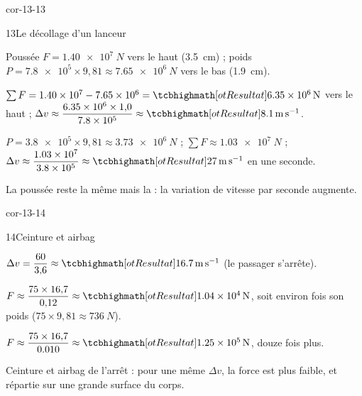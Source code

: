 \begin{blocLivre}{cor-13-13}
\begin{corrige}{13}{Le décollage d'un lanceur}
\begin{questions}
\item Poussée $F=\qty{1,40e7}{N}$ vers le haut (\qty{3,5}{cm}) ; poids $P=\num{7,8e5}\times9{,}81\approx\qty{7,65e6}{N}$ vers le bas (\qty{1,9}{cm}).
\item $\sum F=\num{1,40e7}-\num{7,65e6}=\res{\qty{6,35e6}{N}}$ vers le haut ; $\Delta v\approx\dfrac{\num{6,35e6}\times1{,}0}{\num{7,8e5}}\approx\res{\qty{8,1}{m.s^{-1}}}$.
\item $P=\num{3,8e5}\times9{,}81\approx\qty{3,73e6}{N}$ ; $\sum F\approx\qty{1,03e7}{N}$ ; $\Delta v\approx\dfrac{\num{1,03e7}}{\num{3,8e5}}\approx\res{\qty{27}{m.s^{-1}}}$ en une seconde.
\item La poussée reste la même mais la  : la variation de vitesse par seconde augmente.
\end{questions}
\end{corrige}
\end{blocLivre}
\begin{blocLivre}{cor-13-14}
\begin{corrige}{14}{Ceinture et airbag}
\begin{questions}
\item $\Delta v=\dfrac{60}{3{,}6}\approx\res{\qty{16,7}{m.s^{-1}}}$ (le passager s'arrête).
\item $F\approx\dfrac{75\times16{,}7}{0{,}12}\approx\res{\qty{1,04e4}{N}}$, soit environ  fois son poids ($75\times9{,}81\approx\qty{736}{N}$).
\item $F\approx\dfrac{75\times16{,}7}{\num{0,010}}\approx\res{\qty{1,25e5}{N}}$, douze fois plus.
\item Ceinture et airbag  de l'arrêt : pour une même $\Delta v$, la force est plus faible, et répartie sur une
grande surface du corps.
\end{questions}
\end{corrige}
\end{blocLivre}
